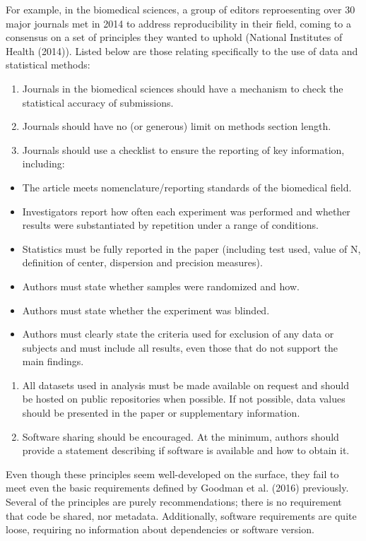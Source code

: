 \documentclass[12pt,twoside]{reedthesis}
\providecommand{\tightlist}{%
  \setlength{\itemsep}{0pt}\setlength{\parskip}{0pt}}
\begin{document}
For example, in the biomedical sciences, a group of editors reproesenting over 30 major journals met in 2014 to address reproducibility in their field, coming to a consensus on a set of principles they wanted to uphold (National Institutes of Health (2014)). Listed below are those relating specifically to the use of data and statistical methods:
\begin{enumerate}
\def\labelenumi{\arabic{enumi})}
\item
  Journals in the biomedical sciences should have a mechanism to check the statistical accuracy of submissions.
\item
  Journals should have no (or generous) limit on methods section length.
\item
  Journals should use a checklist to ensure the reporting of key information, including:
\end{enumerate}
\begin{itemize}
\tightlist
\item
  The article meets nomenclature/reporting standards of the biomedical field.
\item
  Investigators report how often each experiment was performed and whether results were substantiated by repetition under a range of conditions.
\item
  Statistics must be fully reported in the paper (including test used, value of N, definition of center, dispersion and precision measures).
\item
  Authors must state whether samples were randomized and how.
\item
  Authors must state whether the experiment was blinded.
\item
  Authors must clearly state the criteria used for exclusion of any data or subjects and must include all results, even those that do not support the main findings.
\end{itemize}
\begin{enumerate}
\def\labelenumi{\arabic{enumi})}
\setcounter{enumi}{3}
\item
  All datasets used in analysis must be made available on request and should be hosted on public repositories when possible. If not possible, data values should be presented in the paper or supplementary information.
\item
  Software sharing should be encouraged. At the minimum, authors should provide a statement describing if software is available and how to obtain it.
\end{enumerate}
Even though these principles seem well-developed on the surface, they fail to meet even the basic requirements defined by Goodman et al. (2016) previously. Several of the principles are purely recommendations; there is no requirement that code be shared, nor metadata. Additionally, software requirements are quite loose, requiring no information about dependencies or software version.
\end{document}
